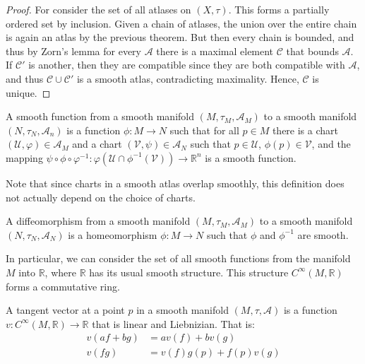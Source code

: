         \begin{proof}
            For consider the set of all atlases on $(X,\tau)$. This forms a
            partially ordered set by inclusion. Given a chain of atlases,
            the union over the entire chain is again an atlas by the previous
            theorem. But then every chain is bounded, and thus by Zorn's lemma
            for every $\mathcal{A}$ there is a maximal element $\mathcal{C}$
            that bounds $\mathcal{A}$. If $\mathcal{C}'$ is another, then
            they are compatible since they are both compatible with
            $\mathcal{A}$, and thus $\mathcal{C}\cup\mathcal{C}'$ is a smooth
            atlas, contradicting maximality. Hence, $\mathcal{C}$ is unique.
        \end{proof}
        \begin{definition}
            A smooth function from a smooth manifold
            $(M,\tau_{M},\mathcal{A}_{M})$ to a smooth manifold
            $(N,\tau_{N},\mathcal{A}_{n})$ is a function $\phi:M\rightarrow{N}$
            such that for all $p\in{M}$ there is a chart
            $(\mathcal{U},\varphi)\in\mathcal{A}_{M}$ and a chart
            $(\mathcal{V},\psi)\in\mathcal{A}_{N}$ such that $p\in\mathcal{U}$,
            $\phi(p)\in\mathcal{V}$, and the mapping
            $\psi\circ\phi\circ\varphi^{\minus{1}}:%
             \varphi(\mathcal{U}\cap\phi^{\minus{1}}(\mathcal{V}))%
             \rightarrow\mathbb{R}^{n}$ is a smooth function.
        \end{definition}
        Note that since charts in a smooth atlas overlap smoothly, this
        definition does not actually depend on the choice of charts.
        \begin{definition}
            A diffeomorphism from a smooth manifold
            $(M,\tau_{M},\mathcal{A}_{M})$ to a smooth manifold
            $(N,\tau_{N},\mathcal{A}_{N})$ is a homeomorphism
            $\phi:M\rightarrow{N}$ such that $\phi$ and $\phi^{\minus{1}}$ are
            smooth.
        \end{definition}
        In particular, we can consider the set of all smooth functions
        from the manifold $M$ into $\mathbb{R}$, where $\mathbb{R}$ has its
        usual smooth structure. This structure $C^{\infty}(M,\mathbb{R})$ forms
        a commutative ring.
        \begin{definition}
            A tangent vector at a point $p$ in a smooth manifold
            $(M,\tau,\mathcal{A})$ is a function
            $v:C^{\infty}(M,\mathbb{R})\rightarrow\mathbb{R}$ that is linear and
            Liebnizian. That is:
            \begin{align}
                v(af+bg)&=av(f)+bv(g)\tag{Linearity}\\
                v(fg)&=v(f)g(p)+f(p)v(g)\tag{Liebnizian}
            \end{align}
        \end{definition}

